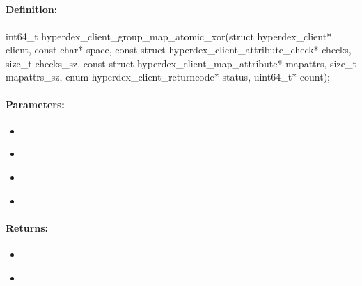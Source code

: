 \pagebreak
\subsection{}
\label{api:c:group_map_atomic_xor}


\paragraph{Definition:}
\begin{ccode}
int64_t hyperdex_client_group_map_atomic_xor(struct hyperdex_client* client,
        const char* space,
        const struct hyperdex_client_attribute_check* checks, size_t checks_sz,
        const struct hyperdex_client_map_attribute* mapattrs, size_t mapattrs_sz,
        enum hyperdex_client_returncode* status,
        uint64_t* count);
\end{ccode}

\paragraph{Parameters:}
\begin{itemize}[noitemsep]
\item {}\\

\item {}\\

\item {}\\

\item {}\\

\end{itemize}

\paragraph{Returns:}
\begin{itemize}[noitemsep]
\item {}\\

\item {}\\

\end{itemize}

